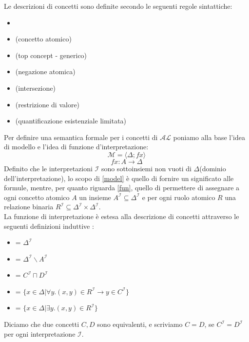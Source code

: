 Le descrizioni di concetti sono definite secondo le seguenti regole sintattiche:
\begin{itemize}
	\item[] 
	\item[] \makebox[2cm]{$\top$ \hfill} (concetto atomico)
	\item[] \makebox[2cm]{$\bot$ \hfill} (top concept - generico)
	\item[]  (negazione atomica)
	\item[]  (intersezione)
	\item[]  (restrizione di valore)
	\item[]  (quantificazione esistenziale limitata)
\end{itemize}
Per definire una semantica formale per i concetti di $\mathcal{AL}$ poniamo alla base 
l'idea di modello e l'idea di funzione d'interpretazione:
\begin{equation} \label{model}
\mathcal{M} = \langle \Delta;fx \rangle
\end{equation} 
\begin{equation} \label{fun}
fx: A \to \Delta
\end{equation}
Definito che le interpretazioni $\mathcal{I}$ sono sottoinsiemi non vuoti di $\Delta$(dominio dell'interpretazione),
lo scopo di \ref{model} è quello di fornire un significato alle formule, mentre, 
per quanto riguarda \ref{fun}, quello di
permettere di assegnare a ogni concetto atomico $\mathit{A}$ un insieme 
$\mathit{A^{\mathcal{I}} \subseteq \Delta^{\mathcal{I}}}$ 
e per ogni ruolo atomico $\mathit{R}$ una relazione binaria 
$\mathit{R^{\mathcal{I}} \subseteq \Delta^{\mathcal{I}} \times \Delta^{\mathcal{I}}}$.\\
La funzione di interpretazione è estesa alla descrizione di concetti attraverso le seguenti definizioni induttive :
\begin{itemize}
	\item[]  = $\Delta^{\mathcal{I}}$  
	\item[]  = 
	$\Delta^{\mathcal{I}}\backslash A^{\mathcal{I}}$
	\item[]  = 
	$ C^{\mathcal{I}} \sqcap D^{\mathcal{I}} $  
	\item[]  = 
	$\{x \in \Delta| \forall y.(x,y) \in R^{\mathcal{I}} \to y \in C^{\mathcal{I}} \}$
	\item[]  = 
	$\{x \in \Delta| \exists y.(x,y) \in R^{\mathcal{I}} \}$
\end{itemize}
Diciamo che due concetti $C, D$ sono equivalenti, e scriviamo $C = D$, se
$C^{\mathcal{I}} = D^{\mathcal{I}}$ per ogni interpretazione ${\mathcal{I}}$.
